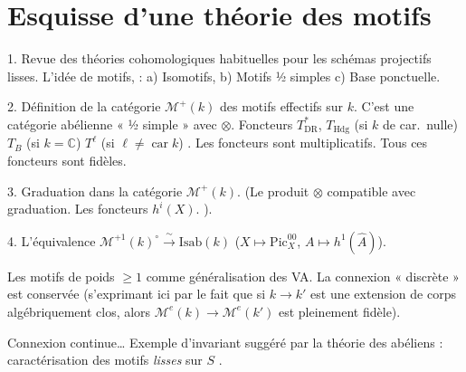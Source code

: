 \documentclass[11pt,a4paper]{article}
\begin{document}
\section{Esquisse d'une théorie des motifs}

1. Revue des théories cohomologiques habituelles pour les schémas projectifs
lisses. L'idée de motifs, 
 : a) Isomotifs, b) Motifs ½ simples c) Base ponctuelle.

2. Définition de la catégorie $\mathcal{M}^{+}(k)$ des motifs effectifs sur
$k$. C'est une catégorie abélienne « ½ simple » avec $\otimes$. Foncteurs
$T^{*}_{\mathrm{DR}}$, $T_{\mathrm{Hdg}}$ (si $k$ de car.\ nulle)
$T_{B}$ (si $k = \mathbb{C}$) $T^{\ell}$ (si $\ell \neq \operatorname{car} k$)
\struck{\ill{}}. Les foncteurs sont multiplicatifs. Tous ces foncteurs sont
fidèles.

3. Graduation dans la catégorie $\mathcal{M}^{+}(k)$. (Le produit $\otimes$
compatible avec graduation. Les foncteurs $h^{i}(X)$.
).

4. L'équivalence $\mathcal{M}^{+1}(k)^{\circ} \xrightarrow{\ \sim\ }
\mathrm{Isab}(k)$ ($X \mapsto \mathrm{Pic}^{00}_{X}$,
$A \mapsto h^{1}(\hat{A})$).

Les motifs de poids $\geq 1$ comme généralisation des VA. La connexion
« discrète » est conservée (s'exprimant ici par le fait que si
$k \to k'$ est une extension de corps algébriquement clos, alors
$\mathcal{M}^{e}(k) \to \mathcal{M}^{e}(k')$ est pleinement fidèle).

Connexion continue… Exemple d'invariant suggéré par la théorie des
 abéliens : caractérisation des motifs \emph{lisses} sur
$S$  .
\end{document}
